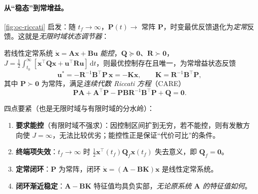 \paragraph{从“稳态”到常增益。}
\cref{fig:oc-riccati} 启发：随 $t_f\to\infty$，$\mathbf P(t)\to$ 常阵 $\mathbf P$，时变最优反馈退化为\emph{定常}反馈。这就是\emph{无限时域状态调节器}\cite{liubao2006modern,anderson2007optimal}：

\begin{theorem}\label{thm:oc-infinite-lqr}
若线性定常系统 $\dot{\mathbf x}=\mathbf A\mathbf x+\mathbf B\mathbf u$ \emph{能控}，$\mathbf Q\succeq\mathbf0$、$\mathbf R\succ\mathbf0$，$J=\tfrac12\int_{t_0}^{\infty}[\mathbf x^\top\mathbf Q\mathbf x+\mathbf u^\top\mathbf R\mathbf u]\,\mathrm dt$，则最优控制存在且唯一，为常增益状态反馈
\begin{equation}
  \mathbf u^*=-\mathbf R^{-1}\mathbf B^\top\mathbf P\,\mathbf x=-\mathbf K\mathbf x,\qquad\mathbf K=\mathbf R^{-1}\mathbf B^\top\mathbf P,
  \label{eq:oc-infinite-u}
\end{equation}
其中 $\mathbf P\succ\mathbf0$ 为常阵，满足\emph{连续代数 Riccati 方程}（CARE）
\begin{equation}
  \mathbf P\mathbf A+\mathbf A^\top\mathbf P-\mathbf P\mathbf B\mathbf R^{-1}\mathbf B^\top\mathbf P+\mathbf Q=\mathbf0.
  \label{eq:oc-care}
\end{equation}
\end{theorem}

\noindent 四点要紧（也是无限时域与有限时域的分水岭）：
\begin{enumerate}
  \item \textbf{要求能控}（有限时域不强求）：因控制区间扩到无穷，若不能控，则有发散方向使 $J=\infty$，无法比较优劣；能控性正是保证“代价可比”的条件。
  \item \textbf{终端项失效}：$t_f\to\infty$ 时 $\tfrac12\mathbf x^\top(t_f)\mathbf Q_f\mathbf x(t_f)$ 失去意义，即 $\mathbf Q_f=\mathbf0$。
  \item \textbf{定常闭环}：$\mathbf P$ 为常阵，闭环 $\dot{\mathbf x}=(\mathbf A-\mathbf B\mathbf K)\mathbf x$ 是线性定常系统。
  \item \textbf{闭环渐近稳定}：$\mathbf A-\mathbf B\mathbf K$ 特征值均具负实部，\emph{无论原系统 $\mathbf A$ 的特征值如何}。
\end{enumerate}

